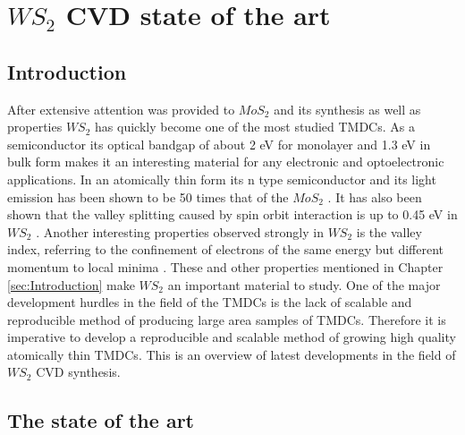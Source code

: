 \chapter{$WS_2$ CVD state of the art}

\section{Introduction}
After extensive attention was provided to $MoS_2$ and its synthesis as well as properties $WS_2$ has quickly become one of the most studied TMDCs. As a semiconductor its optical bandgap of about 2 eV for monolayer and 1.3 eV in bulk form makes it an interesting material for any electronic and optoelectronic applications. In an atomically thin form its n type semiconductor \cite{ExtraordinaryRoomTemperaturePhotoluminescenceInTriangularWS2Monolayers}\cite{doi:10.1021/nn5059908}\cite{Iqbal2015} and its light emission has been shown to be 50 times that of the $MoS_2$ \cite{doi:10.1021/nn4046002}. It has also been shown that the valley splitting caused by spin orbit interaction is up to 0.45 eV in $WS_2$ \cite{GiantSpin-orbit-inducedSpinSplittingInTwo-dimensionalTransition-metalDichalcogenideSemiconductors}. Another interesting properties observed strongly in $WS_2$ is the valley index, referring to the confinement of electrons of the same energy but different momentum to local minima \cite{ElectronicsAndOptoelectronicsOfTwo-dimensionalTransitionMetalDichalcogenides}. These and other properties mentioned in Chapter \ref{sec:Introduction} make $WS_2$ an important material to study. One of the major development hurdles in the field of the TMDCs is the lack of scalable and reproducible method of producing large area samples of TMDCs. Therefore it is imperative to develop a reproducible and scalable method of growing high quality atomically thin TMDCs. This is an overview of latest developments in the field of $WS_2$ CVD synthesis.

\section{The state of the art}
